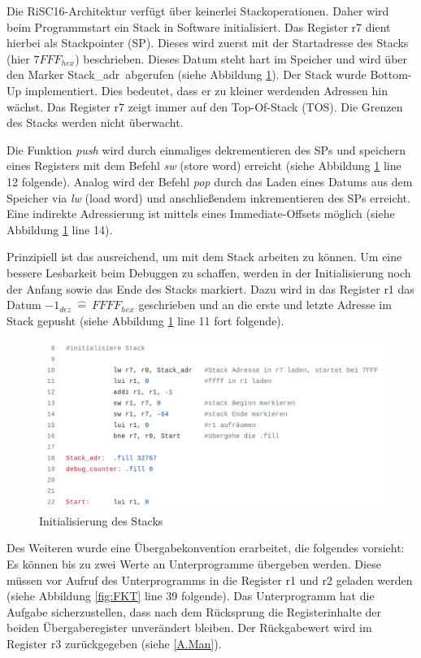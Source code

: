 \documentclass[fleqn, a4paper, 11pt]{article}       %
\begin{document}
Die RiSC16-Architektur verfügt über keinerlei Stackoperationen. Daher wird beim Programmstart ein Stack in Software initialisiert. Das Register r7 dient hierbei als Stackpointer (SP). Dieses wird zuerst mit der Startadresse des Stacks (hier $7FFF_{hex}$) beschrieben. Dieses Datum steht hart im Speicher und wird über den Marker \glqq Stack\_adr\grqq \ abgerufen (siehe  Abbildung \ref{fig:Stack}).
Der Stack wurde   Bottom-Up implementiert. Dies bedeutet, dass er zu kleiner werdenden Adressen hin wächst. Das Register r7 zeigt immer auf den Top-Of-Stack (TOS). Die Grenzen des Stacks werden nicht überwacht.

Die Funktion \emph{push}  wird durch einmaliges dekrementieren des SPs und speichern eines Registers mit dem Befehl \emph{sw} (store word) erreicht (siehe Abbildung \ref{fig:Stack} line 12 folgende). Analog wird der Befehl \emph{pop} durch das Laden eines Datums aus dem Speicher via \emph{lw} (load word) und anschließendem inkrementieren des SPs erreicht. Eine indirekte Adressierung ist mittels eines Immediate-Offsets möglich (siehe Abbildung \ref{fig:Stack} line 14).

Prinzipiell ist das ausreichend, um mit dem Stack arbeiten zu können. Um eine bessere Lesbarkeit beim Debuggen zu schaffen, werden in der Initialisierung noch der Anfang sowie das Ende des Stacks markiert. Dazu wird in das Register r1 das Datum $-1_{dez}\ \widehat{=}\ FFFF_{hex}$ geschrieben und an die erste und letzte Adresse im Stack gepusht (siehe Abbildung \ref{fig:Stack} line 11 fort folgende).

\begin{figure}[h]
    \includegraphics[width =1\textwidth]{Stack_init.png}
\caption{Initialisierung des Stacks}
\label{fig:Stack}
\end{figure}

Des Weiteren wurde eine Übergabekonvention erarbeitet, die folgendes vorsieht: Es können bis zu zwei Werte an Unterprogramme übergeben werden. Diese müssen vor Aufruf des Unterprogramms in die Register r1 und r2 geladen werden (siehe Abbildung \ref{fig:FKT} line 39 folgende). Das Unterprogramm hat die Aufgabe sicherzustellen, dass nach dem Rücksprung die Registerinhalte der beiden Übergaberegister unverändert bleiben. Der Rückgabewert wird im Register r3 zurückgegeben (siehe \ref{A.Man}).
\end{document}
